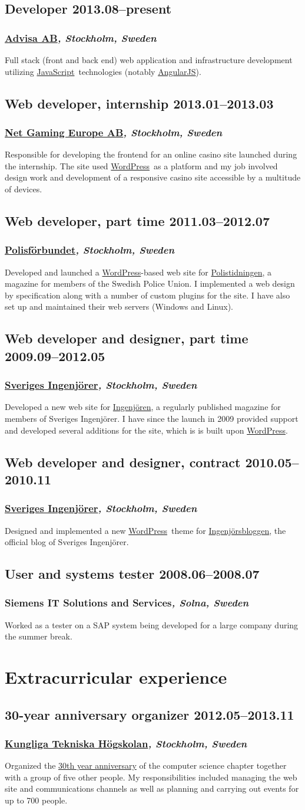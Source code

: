 \documentclass[a4paper,11pt]{article}
\newcommand{\thework}[2]{
  \subsection*{\textbf{#1} \hfill \textbf{#2}}\par%
}
\newcommand{\theplace}[2][]{%
  \subsubsection*{\textbf{#2}\textsl{#1}}%
}
\def\angularjs{\href{http://angularjs.org}{AngularJS}}
\def\javascript{\href{http://en.wikipedia.org/wiki/JavaScript}{JavaScript}}
\def\wordpress{\href{http://wordpress.org}{WordPress}}
\begin{document}
\thework{Developer}{2013.08--present}
\theplace[, Stockholm, Sweden]{\href{http://www.advisa.se}{Advisa AB}}
Full stack (front and back end) web application and infrastructure development
utilizing \javascript\ technologies (notably \angularjs).

\thework{Web developer, internship}{2013.01--2013.03}
\theplace[, Stockholm, Sweden]{\href{http://www.netgaming.se}{Net Gaming Europe AB}}
Responsible for developing the frontend for an online casino site launched
during the internship. The site used \wordpress\ as a platform and my job
involved design work and development of a responsive casino site accessible by
a multitude of devices.

\thework{Web developer, part time}{2011.03--2012.07}
\theplace[, Stockholm, Sweden]{\href{http://www.polisforbundet.se}{Polisförbundet}}
Developed and launched a \wordpress-based web site for
\href{http://www.polistidningen.se}{Polistidningen}, a magazine for members of
the \mbox{Swedish} Police Union. I implemented a web design by specification
along with a number of custom plugins for the site. I have also set up and
maintained their web servers (Windows and Linux).

\thework{Web developer and designer, part time}{2009.09--2012.05}
\theplace[, Stockholm, Sweden]{\href{http://www.sverigesingenjorer.se}{Sveriges Ingenjörer}}
Developed a new web site for \href{http://www.ingenjoren.se}{Ingenjören}, a
regularly published magazine for members of Sveriges Ingenjörer. I have since
the launch in 2009 provided support and developed several additions for the
site, which is is built upon \wordpress.

\thework{Web developer and designer, contract}{2010.05--2010.11}
\theplace[, Stockholm, Sweden]{\href{http://www.sverigesingenjorer.se}{Sveriges Ingenjörer}}
Designed and implemented a new \wordpress\ theme for
\href{http://www.ingenjorsbloggen.se}{Ingenjörsbloggen}, the official blog of
Sveriges Ingenjörer.

\thework{User and systems tester}{2008.06--2008.07}
\theplace[, Solna, Sweden]{Siemens IT Solutions and Services}
Worked as a tester on a SAP system being developed for a large company during
the summer break.

\section*{Extracurricular experience}%

\thework{30-year anniversary organizer}{2012.05--2013.11}
\theplace[, Stockholm, Sweden]{\href{http://kth.se}{Kungliga Tekniska Högskolan}}
Organized the \href{http://djubileet.se/}{30th year anniversary} of the
computer science chapter together with a group of five other people. My
responsibilities included managing the web site and communications channels as
well as planning and carrying out events for up to 700 people.
\end{document}

